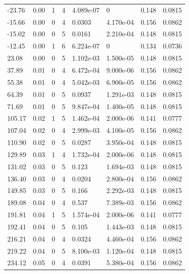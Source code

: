 \documentclass[preview]{standalone}
\begin{document}
{{\begin{tabular}{L{1.2cm}C{1.2cm} C{0.3cm}C{0.5cm} C{1.4cm}C{1.4cm} C{1.4cm}C{1.4cm}}
  -23.76  &  0.00  & 1     &  4 &  4.089e-07  & 0  & 0.148 &  0.0815   \\ 
  -15.66  &  0.00  & 0     &  4 &  0.0303  & 4.170e-04  & 0.156 &  0.0862   \\ 
  -15.02  &  0.00  & 0     &  5 &  0.0161  & 2.210e-04  & 0.148 &  0.0815   \\ 
  -12.45  &  0.00  & 1     &  6 &  6.224e-07  & 0  & 0.134 &  0.0736   \\ 
  23.08  &  0.00  & 0     &  5 &  1.102e-03  & 1.500e-05  & 0.148 &  0.0815   \\ 
  37.89  &  0.01  & 0     &  4 &  6.472e-04  & 9.000e-06  & 0.156 &  0.0862   \\ 
  55.38  &  0.01  & 0     &  4 &  5.042e-03  & 6.900e-05  & 0.156 &  0.0862   \\ 
  64.39  &  0.01  & 0     &  5 &  0.0937  & 1.291e-03  & 0.148 &  0.0815   \\ 
  71.69  &  0.01  & 0     &  5 &  9.847e-04  & 1.400e-05  & 0.148 &  0.0815   \\ 
  105.17  &  0.02  & 1     &  5 &  1.462e-04  & 2.000e-06  & 0.141 &  0.0777   \\ 
  107.04  &  0.02  & 0     &  4 &  2.999e-03  & 4.100e-05  & 0.156 &  0.0862   \\ 
  110.90  &  0.02  & 0     &  5 &  0.0287  & 3.950e-04  & 0.148 &  0.0815   \\ 
  129.89  &  0.03  & 1     &  4 &  1.732e-04  & 2.000e-06  & 0.148 &  0.0815   \\ 
  131.02  &  0.03  & 0     &  5 &  0.123  & 1.694e-03  & 0.148 &  0.0815   \\ 
  136.40  &  0.03  & 0     &  4 &  0.0204  & 2.800e-04  & 0.156 &  0.0862   \\ 
  149.85  &  0.03  & 0     &  5 &  0.166  & 2.292e-03  & 0.148 &  0.0815   \\ 
  189.08  &  0.04  & 0     &  4 &  0.537  & 7.389e-03  & 0.156 &  0.0862   \\ 
  191.81  &  0.04  & 1     &  5 &  1.574e-04  & 2.000e-06  & 0.141 &  0.0777   \\ 
  192.41  &  0.04  & 0     &  5 &  0.105  & 1.443e-03  & 0.148 &  0.0815   \\ 
  216.21  &  0.04  & 0     &  4 &  0.0324  & 4.460e-04  & 0.156 &  0.0862   \\ 
  219.22  &  0.04  & 0     &  5 &  8.100e-03  & 1.120e-04  & 0.148 &  0.0815   \\ 
  234.12  &  0.05  & 0     &  4 &  0.0391  & 5.380e-04  & 0.156 &  0.0862   \\ 

\end{tabular}}}
\end{document}
